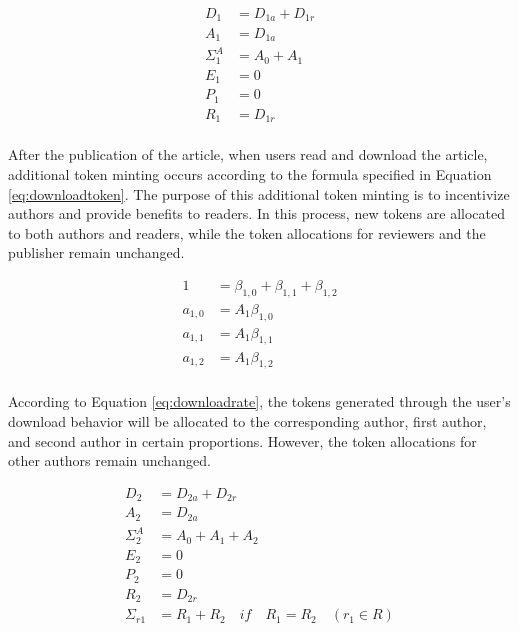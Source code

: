 \documentclass[lettersize,journal]{IEEEtran}
\begin{document}
\begin{equation}
  \begin{aligned}
    D_1 &= D_{1a} + D_{1r} \\
    A_1 &= D_{1a} \\
    \Sigma^A_1 &= A_0 + A_1 \\
    E_1 &= 0 \\
    P_1 &= 0 \\
    R_1 &= D_{1r} \\
  \end{aligned}
  \label{eq:downloadtoken}
\end{equation}

After the publication of the article, when users read and download the article, additional token minting occurs according to the formula specified in Equation \ref{eq:downloadtoken}. The purpose of this additional token minting is to incentivize authors and provide benefits to readers. In this process, new tokens are allocated to both authors and readers, while the token allocations for reviewers and the publisher remain unchanged.

\begin{equation}
  \begin{aligned}
    1 &= \beta_{1, 0} + \beta_{1, 1} + \beta_{1, 2} \\
    a_{1,0} &= A_1 \beta_{1, 0}  \\
    a_{1,1} &= A_1 \beta_{1, 1}  \\
    a_{1,2} &= A_1 \beta_{1, 2}  \\
  \end{aligned}
  \label{eq:downloadrate}
\end{equation}

According to Equation \ref{eq:downloadrate}, the tokens generated through the user's download behavior will be allocated to the corresponding author, first author, and second author in certain proportions. However, the token allocations for other authors remain unchanged.


\begin{equation}
  \begin{aligned}
    D_2 &= D_{2a} + D_{2r} \\
    A_2 &= D_{2a} \\
    \Sigma^A_2 &= A_0 + A_1 + A_2 \\
    E_2 &= 0 \\
    P_2 &= 0 \\
    R_2 &= D_{2r} \\
    \Sigma_{r1} & = R_1 + R_2 \quad if \quad R_1 = R_2 \quad (r_1 \in R ) 
  \end{aligned}
  \label{eq:citetoken}
\end{equation}
\end{document}
